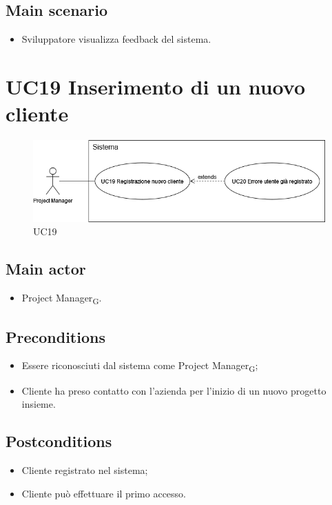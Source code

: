 \documentclass{article}
\begin{document}
    \subsection*{Main scenario}
        \begin{itemize}
            \item Sviluppatore visualizza feedback del sistema.
        \end{itemize}
    

        
\section{UC19 Inserimento di un nuovo cliente}
    \begin{figure}[h]
      \centering
      \includegraphics[width=.8\textwidth, height=.6\textheight, keepaspectratio]{documenti/imgUML/UC19-INSERIMENTO-NUOVO-CLIENTE.drawio.png}
    \caption{UC19}
      \label{fig:UC19}
    \end{figure}
    
    \subsection*{Main actor}
        \begin{itemize}
            \item Project Manager\textsubscript{G}.
        \end{itemize}
        
    \subsection*{Preconditions}
        \begin{itemize}
            \item Essere riconosciuti dal sistema come Project Manager\textsubscript{G};
            \item Cliente ha preso contatto con l'azienda per l'inizio di un nuovo progetto insieme.
        \end{itemize}
        
    \subsection*{Postconditions}
        \begin{itemize}
            \item Cliente registrato nel sistema;
            \item Cliente può effettuare il primo accesso.
        \end{itemize}
    
\end{document}

